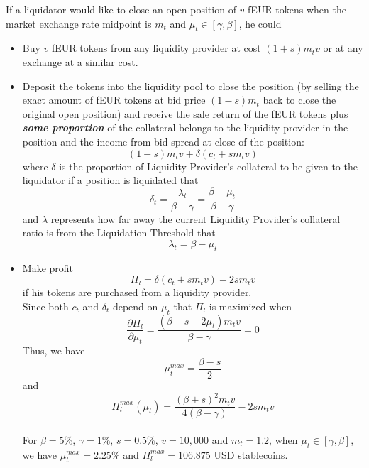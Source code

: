 \documentclass{article}
\begin{document}
If a liquidator would like to close an open position of $v$ fEUR tokens when the market exchange rate midpoint is $m_t$ and $\mu_t \in [\gamma,\beta]$, he could

\begin{itemize}

    \item Buy $v$ fEUR tokens from any liquidity provider at cost $(1+s)m_t v$ or at any exchange at a similar cost. 
    
    \item Deposit the tokens into the liquidity pool to close the position (by selling the exact amount of fEUR tokens at bid price $(1-s)m_t$ back to close the original open position) and receive the sale return of the fEUR tokens plus \textbf{\textit{some proportion}} of the collateral belongs to the liquidity provider in the position and the income from bid spread at close of the position:
    $$(1-s)m_t v + \delta(c_t + s m_t v)$$
    where $\delta$ is the proportion of Liquidity Provider's collateral to be given to the liquidator if a position is liquidated that $$ \delta_t=\frac{\lambda_t}{\beta-\gamma}=\frac{\beta-\mu_t}{\beta-\gamma}$$
    and $\lambda$ represents how far away the current Liquidity Provider's collateral ratio is from the Liquidation Threshold that $$\lambda_t=\beta-\mu_t$$
    
    \begin{center}
    \end{center}

    \item Make profit 
    $$\Pi_l = \delta(c_t + s m_t v) -2s m_t v$$
    if his tokens are purchased from a liquidity provider.\\
    Since both $c_t$ and $\delta_t$ depend on $\mu_t$ that $\Pi_l$ is maximized when 
    $$\frac{\partial \Pi_l}{\partial \mu_t}=\frac{(\beta - s - 2\mu_t)m_t v}{\beta - \gamma}=0$$
    Thus, we have 
    $$\mu_t^{max}=\frac{\beta - s}{2}$$ and 
    $$\Pi_l^{max}(\mu_t)=\frac{(\beta + s)^2 m_t v}{4(\beta - \gamma)}-2s m_t v$$
    \\
    For $\beta = 5\%$, $\gamma = 1\%$, $s=0.5\%$, $v=10,000$ and $m_t=1.2$, when $\mu_t\in [\gamma,\beta]$, we have $\mu_t^{max}=2.25\%$ and $\Pi_l^{max}=106.875$ USD stablecoins.

\end{itemize}
\end{document}
